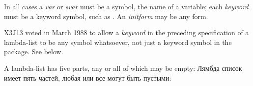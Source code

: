 \begin{obsolete}
In all cases a \textit{var} or \textit{svar} must be a symbol, the name of a variable;
each \textit{keyword} must be a keyword symbol, such as .
An \textit{initform} may be any form.
\end{obsolete}

\begin{newer}
X3J13 voted in March 1988 
to allow a \textit{keyword} in the preceding specification of a lambda-list
to be any symbol whatsoever, not just a keyword symbol
in the  package.  See below.
\end{newer}

A lambda-list has five parts, any or all of which may be empty:
Лямбда список имеет пять частей, любая или все могут быть пустыми:

